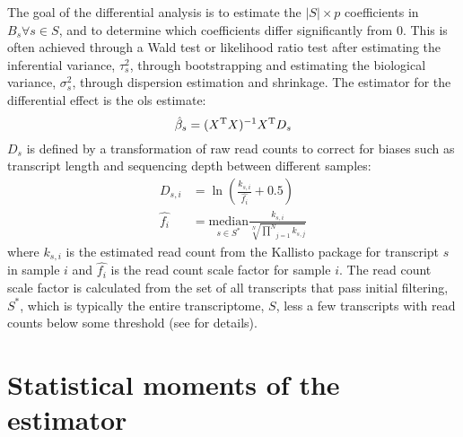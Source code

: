 The goal of the differential analysis is to estimate the $|S| \times p$ coefficients in $B_s \forall s \in S$, and to determine which coefficients differ significantly from 0.
This is often achieved through a Wald test or likelihood ratio test after estimating the inferential variance, $\tau_s^2$, through bootstrapping and estimating the biological variance, $\sigma_s^2$, through dispersion estimation and shrinkage.
The estimator for the differential effect is the \gls{ols} estimate:
%
\begin{equation}
  \hat{\beta}_s = (X^{\mathrm{T}} X)^{-1} X^{\mathrm{T}} D_s
\end{equation}
%
$D_s$ is defined by a transformation of raw read counts to correct for biases such as transcript length and sequencing depth between different samples:
%
\begin{align}
  D_{s,i}   & = \ln \left(\frac{k_{s,i}}{\hat{f_i}} + 0.5 \right)                                                            \\
  \hat{f_i} & = \underset{s \in S^*}{\mathrm{median}} \frac{k_{s,i}}{\sqrt[N]{\underset{j = 1}{\overset{N}{\prod }}k_{s,j}}}
\end{align}
%
where $k_{s,i}$ is the estimated read count from the Kallisto package \cite{brayNearoptimalProbabilisticRNAseq2016} for transcript $s$ in sample $i$ and $\hat{f_i}$ is the read count scale factor for sample $i$.
The read count scale factor is calculated from the set of all transcripts that pass initial filtering, $S^*$, which is typically the entire transcriptome, $S$, less a few transcripts with read counts below some threshold (see \cite[REF][]{pimentelDifferentialAnalysisRNAseq2017} for details).

\section{Statistical moments of the  estimator}

